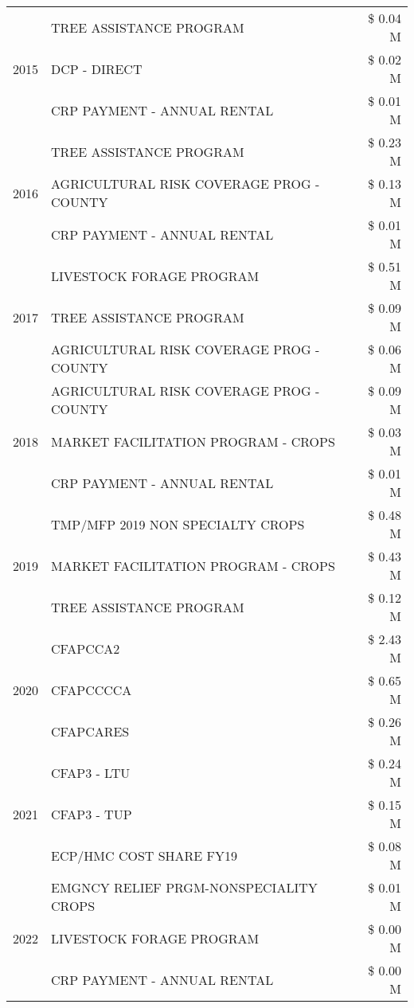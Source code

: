 \begin{tabular}{llr}
\cline{1-3}
\multirow[t]{3}{*}{2015} & TREE ASSISTANCE PROGRAM & \$ 0.04 M \\
 & DCP - DIRECT & \$ 0.02 M \\
 & CRP PAYMENT - ANNUAL RENTAL & \$ 0.01 M \\
\cline{1-3}
\multirow[t]{3}{*}{2016} & TREE ASSISTANCE PROGRAM & \$ 0.23 M \\
 & AGRICULTURAL RISK COVERAGE PROG - COUNTY & \$ 0.13 M \\
 & CRP PAYMENT - ANNUAL RENTAL & \$ 0.01 M \\
\cline{1-3}
\multirow[t]{3}{*}{2017} & LIVESTOCK FORAGE PROGRAM & \$ 0.51 M \\
 & TREE ASSISTANCE PROGRAM & \$ 0.09 M \\
 & AGRICULTURAL RISK COVERAGE PROG - COUNTY & \$ 0.06 M \\
\cline{1-3}
\multirow[t]{3}{*}{2018} & AGRICULTURAL RISK COVERAGE PROG - COUNTY & \$ 0.09 M \\
 & MARKET FACILITATION PROGRAM - CROPS & \$ 0.03 M \\
 & CRP PAYMENT - ANNUAL RENTAL & \$ 0.01 M \\
\cline{1-3}
\multirow[t]{3}{*}{2019} & TMP/MFP 2019 NON SPECIALTY CROPS & \$ 0.48 M \\
 & MARKET FACILITATION PROGRAM - CROPS & \$ 0.43 M \\
 & TREE ASSISTANCE PROGRAM & \$ 0.12 M \\
\cline{1-3}
\multirow[t]{3}{*}{2020} & CFAPCCA2 & \$ 2.43 M \\
 & CFAPCCCCA & \$ 0.65 M \\
 & CFAPCARES & \$ 0.26 M \\
\cline{1-3}
\multirow[t]{3}{*}{2021} & CFAP3 - LTU & \$ 0.24 M \\
 & CFAP3 - TUP & \$ 0.15 M \\
 & ECP/HMC COST SHARE FY19 & \$ 0.08 M \\
\cline{1-3}
\multirow[t]{3}{*}{2022} & EMGNCY RELIEF PRGM-NONSPECIALITY CROPS & \$ 0.01 M \\
 & LIVESTOCK FORAGE PROGRAM & \$ 0.00 M \\
 & CRP PAYMENT - ANNUAL RENTAL & \$ 0.00 M \\
\cline{1-3}
\bottomrule
\end{tabular}
